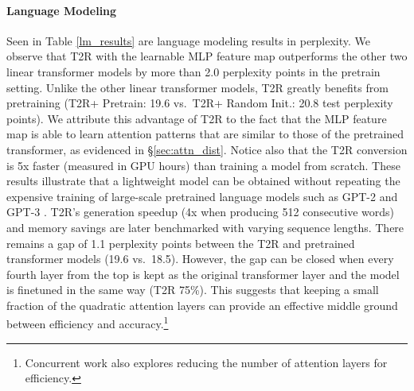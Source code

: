 \documentclass[11pt]{article}
\newcommand{\TRNN}{T2R\xspace}
\begin{document}
\paragraph{Language Modeling}
Seen in Table \ref{lm_results} are language modeling results in perplexity.
We observe that \TRNN with the learnable MLP feature map outperforms the other two linear transformer models by more than 2.0 perplexity points in the pretrain setting.
Unlike the other linear transformer models, \TRNN greatly benefits from pretraining (\TRNN + Pretrain: 19.6 vs.\ \TRNN + Random Init.: 20.8 test perplexity points).
We attribute this advantage of \TRNN to the fact that the MLP feature map is able to learn attention patterns that are similar to those of the pretrained transformer,
as evidenced in \S\ref{sec:attn_dist}.
Notice also that the \TRNN conversion is 5x faster (measured in GPU hours) than training a model from scratch.
These results illustrate that a lightweight model can be obtained without repeating the expensive training of large-scale pretrained language models such as GPT-2 and GPT-3 \cite{gpt2, gpt3}.
\TRNN's generation speedup (4x when producing 512 consecutive words) and memory savings are later benchmarked with varying sequence lengths.
There remains a gap of 1.1 perplexity points between the \TRNN and pretrained transformer models (19.6 vs.\ 18.5).
However, the gap can be closed when every fourth layer from the top is kept as the original transformer layer and the model is finetuned in the same way (\TRNN 75\%). 
This suggests that keeping a small fraction of the quadratic attention layers can provide an effective middle ground between efficiency and accuracy.\footnote{Concurrent work \cite{attention-meets} also explores reducing the number of attention layers for efficiency.}
\end{document}
